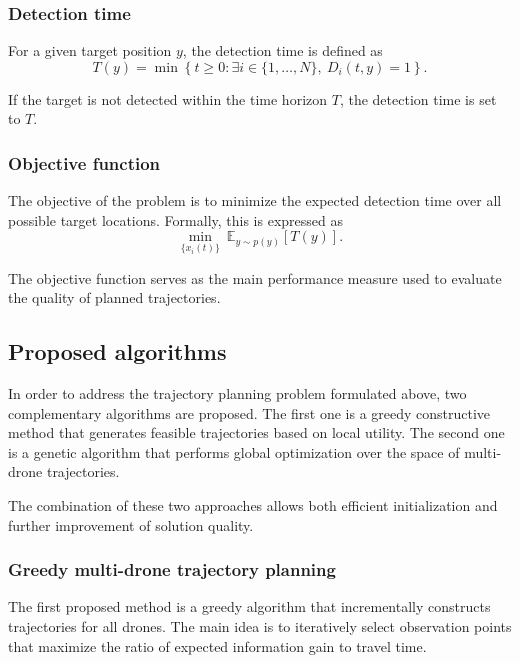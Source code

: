 \documentclass[english]{projectreport}
\begin{document}
\subsubsection{Detection time}

For a given target position $y$, the detection time is defined as
\begin{equation}
T(y) = \min \left\{ t \geq 0 : \exists i \in \{1, \dots, N\}, \ D_i(t, y) = 1 \right\}.
\end{equation}

If the target is not detected within the time horizon $T$, the detection time is set to $T$.

\subsubsection{Objective function}

The objective of the problem is to minimize the expected detection time over all possible target locations. Formally, this is expressed as
\begin{equation}
\min_{\{x_i(t)\}} \ \mathbb{E}_{y \sim p(y)} \left[ T(y) \right].
\end{equation}

The objective function serves as the main performance measure used to evaluate the quality of planned trajectories.

\subsection{Proposed algorithms}

In order to address the trajectory planning problem formulated above, two complementary algorithms are proposed. The first one is a greedy constructive method that generates feasible trajectories based on local utility. The second one is a genetic algorithm that performs global optimization over the space of multi-drone trajectories.

The combination of these two approaches allows both efficient initialization and further improvement of solution quality.

\subsubsection{Greedy multi-drone trajectory planning}

The first proposed method is a greedy algorithm that incrementally constructs trajectories for all drones. The main idea is to iteratively select observation points that maximize the ratio of expected information gain to travel time.
\end{document}
